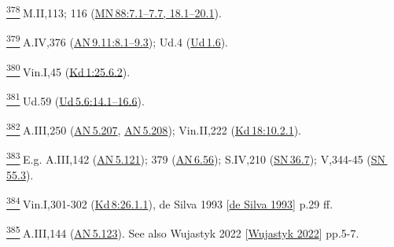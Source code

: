 \label{footprints_split_024.html_fn378}
\hyperref[footprints_split_011.htmlux5cux23fnref378]{\textsuperscript{378}} M.II,113;
116
(\href{https://suttacentral.net/mn88/en/sujato\#7.1}{MN\,88:7.1--7.7,
18.1--20.1}).

\label{footprints_split_024.html_fn379}
\hyperref[footprints_split_011.htmlux5cux23fnref379]{\textsuperscript{379}} A.IV,376
(\href{https://suttacentral.net/an9.11/en/sujato\#8.1}{AN\,9.11:8.1--9.3});
Ud.4 (\href{https://suttacentral.net/ud1.6/en/sujato}{Ud\,1.6}).

\label{footprints_split_024.html_fn380}
\hyperref[footprints_split_011.htmlux5cux23fnref380]{\textsuperscript{380}} Vin.I,45
(\href{https://suttacentral.net/pli-tv-kd1/en/brahmali?\#25.6.2}{Kd\,1:25.6.2}).

\label{footprints_split_024.html_fn381}
\hyperref[footprints_split_011.htmlux5cux23fnref381]{\textsuperscript{381}} Ud.59
(\href{https://suttacentral.net/ud5.6/en/sujato\#14.1}{Ud\,5.6:14.1--16.6}).

\label{footprints_split_024.html_fn382}
\hyperref[footprints_split_011.htmlux5cux23fnref382]{\textsuperscript{382}} A.III,250
(\href{https://suttacentral.net/an5.207/en/sujato}{AN\,5.207},
\href{https://suttacentral.net/an5.208/en/sujato}{AN\,5.208});
Vin.II,222
(\href{https://suttacentral.net/pli-tv-kd18/en/brahmali?\#10.2.1}{Kd\,18:10.2.1}).

\label{footprints_split_024.html_fn383}
\hyperref[footprints_split_011.htmlux5cux23fnref383]{\textsuperscript{383}} E.g.
A.III,142
(\href{https://suttacentral.net/an5.121/en/sujato}{AN\,5.121}); 379
(\href{https://suttacentral.net/an6.56/en/sujato}{AN\,6.56}); S.IV,210
(\href{https://suttacentral.net/sn36.7/en/sujato}{SN\,36.7}); V,344-45
(\href{https://suttacentral.net/sn55.3/en/sujato}{SN\,55.3}).

\label{footprints_split_024.html_fn384}
\hyperref[footprints_split_011.htmlux5cux23fnref384]{\textsuperscript{384}} Vin.I,301-302
(\href{https://suttacentral.net/pli-tv-kd8/en/brahmali?\#26.1.1}{Kd\,8:26.1.1}),
{de Silva 1993
{{[}\hyperref[footprints_split_022.htmlux5cux23deux5cux2520Silvaux5cux25201993]{de
Silva 1993}{]}}} p.29 ff.

\label{footprints_split_024.html_fn385}
\hyperref[footprints_split_011.htmlux5cux23fnref385]{\textsuperscript{385}} A.III,144
(\href{https://suttacentral.net/an5.123/en/sujato}{AN\,5.123}). See also
{Wujastyk 2022
{{[}\hyperref[footprints_split_022.htmlux5cux23Wujastykux5cux25202022]{Wujastyk
2022}{]}}} pp.5-7.

